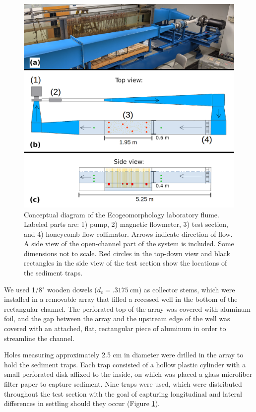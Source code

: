 \documentclass{scrreprt}
\begin{document}
\begin{figure}[htbp]
\includegraphics[width=15cm]{../pics/flume_with_sedtraps.png}
\centering
\caption{Conceptual diagram of the Ecogeomorphology laboratory flume. Labeled parts are: 1) pump, 2) magnetic flowmeter, 3) test section, and 4) honeycomb flow collimator. Arrows indicate direction of flow. A side view of the open-channel part of the system is included. Some dimensions not to scale. Red circles in the top-down view and black rectangles in the side view of the test section show the locations of the sediment traps.}
\label{fig:floorplan}
\end{figure}

We used 1/8" wooden dowels ($d_c = \SI{.3175}{\centi\metre}$) as collector stems, which were installed in a removable array that filled a recessed well in the bottom of the rectangular channel. The perforated top of the array was covered with aluminum foil, and the gap between the array and the upstream edge of the well was covered with an attached, flat, rectangular piece of aluminum in order to streamline the channel. 

Holes measuring approximately 2.5 cm in diameter were drilled in the array to hold the sediment traps. Each trap consisted of a hollow plastic cylinder with a small perforated disk affixed to the inside, on which was placed a glass microfiber filter paper to capture sediment. Nine traps were used, which were distributed throughout the test section with the goal of capturing longitudinal and lateral differences in settling should they occur (Figure \ref{fig:floorplan}).
\end{document}
